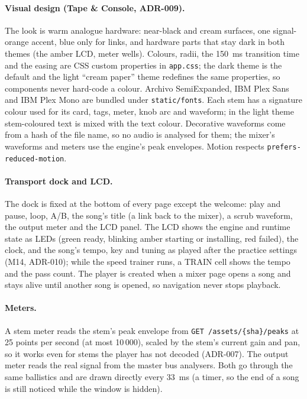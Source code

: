 \documentclass{covermaker}
\begin{document}
\paragraph{Visual design (Tape \& Console, ADR-009).} The look is warm
analogue hardware: near-black and cream surfaces, one signal-orange accent,
blue only for links, and hardware parts that stay dark in both themes (the
amber LCD, meter wells). Colours, radii, the 150~ms transition time and the
easing are CSS custom properties in \texttt{app.css}; the dark theme is the
default and the light ``cream paper'' theme redefines the same properties, so
components never hard-code a colour. Archivo SemiExpanded, IBM Plex Sans and
IBM Plex Mono are bundled under \texttt{static/fonts}. Each stem has a
signature colour used for its card, tags, meter, knob arc and waveform; in the
light theme stem-coloured text is mixed with the text colour. Decorative
waveforms come from a hash of the file name, so no audio is analysed for them;
the mixer's waveforms and meters use the engine's peak envelopes. Motion
respects \texttt{prefers-reduced-motion}.

\paragraph{Transport dock and LCD.} The dock is fixed at the bottom of every
page except the welcome: play and pause, loop, A/B, the song's title (a link
back to the mixer), a scrub waveform, the output meter and the LCD panel. The
LCD shows the engine and runtime state as LEDs (green ready, blinking amber
starting or installing, red failed), the clock, and the song's tempo, key and
tuning as played after the practice settings (M14, ADR-010); while the speed
trainer runs, a TRAIN cell shows the tempo and the pass count. The player is created when a mixer page opens a
song and stays alive until another song is opened, so navigation never stops
playback.

\paragraph{Meters.} A stem meter reads the stem's peak envelope from
\texttt{GET /assets/\{sha\}/peaks} at 25 points per second (at most 10\,000),
scaled by the stem's current gain and pan, so it works even for stems the
player has not decoded (ADR-007). The output meter reads the real signal from
the master bus analysers. Both go through the same ballistics and are drawn
directly every 33~ms (a timer, so the end of a song is still noticed while the
window is hidden).
\end{document}
